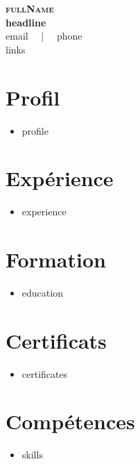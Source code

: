 \documentclass[letterpaper,10pt]{article}
\newcommand{\resumeItem}[1]{\item\small{{#1}}}
\newcommand{\resumeListStart}{\begin{itemize}[leftmargin=0.18in, label={}, itemsep=1.2pt, topsep=2.5pt, parsep=0pt]}
\newcommand{\resumeListEnd}{\end{itemize}\vspace{-2pt}}
\begin{document}
\begin{center}
    \textbf{\Huge \scshape \color{navy} {{fullName}}} \\[3pt]
    \small \textbf{\color{accent} {{headline}}} \\[3pt]
    \footnotesize \color{greytext}
    {{email}} $\quad|\quad$ {{phone}} \\[2pt]
    {{links}}
\end{center}
\vspace{4pt}

\section{Profil}
\resumeListStart
  \resumeItem{ {{profile}} }
\resumeListEnd
\vspace{-2pt}

\section{Expérience}
\resumeListStart
  \resumeItem{ {{experience}} }
\resumeListEnd

\section{Formation}
\resumeListStart
  \resumeItem{ {{education}} }
\resumeListEnd

\section{Certificats}
\resumeListStart
  \resumeItem{ {{certificates}} }
\resumeListEnd

\section{Compétences}
\resumeListStart
  \resumeItem{ {{skills}} }
\resumeListEnd
\end{document}
